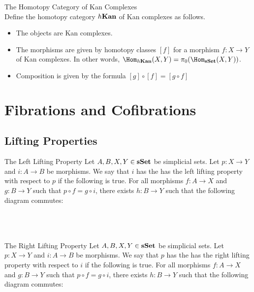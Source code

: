 \documentclass[a4paper]{article}
\begin{document}
\begin{defn}{The Homotopy Category of Kan Complexes}{}\\
Define the homotopy category $h\bold{Kan}$ of Kan complexes as follows. 
\begin{itemize}
\item The objects are Kan complexes. 
\item The morphisms are given by homotopy classes $[f]$ for a morphism $f:X\to Y$ of Kan complexes. In other words, $\Hom_{h\bold{Kan}}(X,Y)=\pi_0(\Hom_{\bold{sSet}}(X,Y))$. 
\item Composition is given by the formula $[g]\circ [f]=[g\circ f]$
\end{itemize}
\end{defn}

\pagebreak
\section{Fibrations and Cofibrations}
\subsection{Lifting Properties}
\begin{defn}{The Left Lifting Property}{} Let $A,B,X,Y\in\bold{sSet}$ be simplicial sets. Let $p:X\to Y$ and $i:A\to B$ be morphisms. We say that $i$ has the has the left lifting property with respect to $p$ if the following is true. For all morphisms $f:A\to X$ and $g:B\to Y$ such that $p\circ f=g\circ i$, there exists $h:B\to Y$ such that the following diagram commutes: \\~\\
\\~\\
\end{defn}

\begin{defn}{The Right Lifting Property}{} Let $A,B,X,Y\in\bold{sSet}$ be simplicial sets. Let $p:X\to Y$ and $i:A\to B$ be morphisms. We say that $p$ has the has the right lifting property with respect to $i$ if the following is true. For all morphisms $f:A\to X$ and $g:B\to Y$ such that $p\circ f=g\circ i$, there exists $h:B\to Y$ such that the following diagram commutes: \\~\\
\\~\\
\end{defn}
\end{document}
